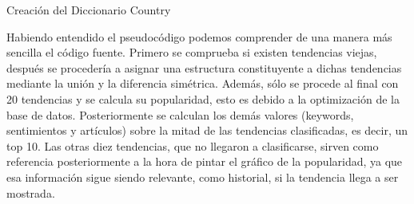 \begin{algorithm}[H]


    \caption{Creación del Diccionario Country}

\end{algorithm}

\vspace{0.3cm}

Habiendo entendido el pseudocódigo podemos comprender de una manera más sencilla el código fuente. Primero se comprueba si existen tendencias viejas, después se procedería a asignar una estructura constituyente a dichas tendencias mediante la unión y la diferencia simétrica. Además, sólo se procede al final con 20 tendencias y se calcula su popularidad, esto es debido a la optimización de la base de datos. Posteriormente se calculan los demás valores (keywords, sentimientos y artículos) sobre la mitad de las tendencias clasificadas, es decir, un top 10. Las otras diez tendencias, que no llegaron a clasificarse, sirven como referencia posteriormente a la hora de pintar el gráfico de la popularidad, ya que esa información sigue siendo relevante, como historial, si la tendencia llega a ser mostrada.

\vspace{0.3cm}

